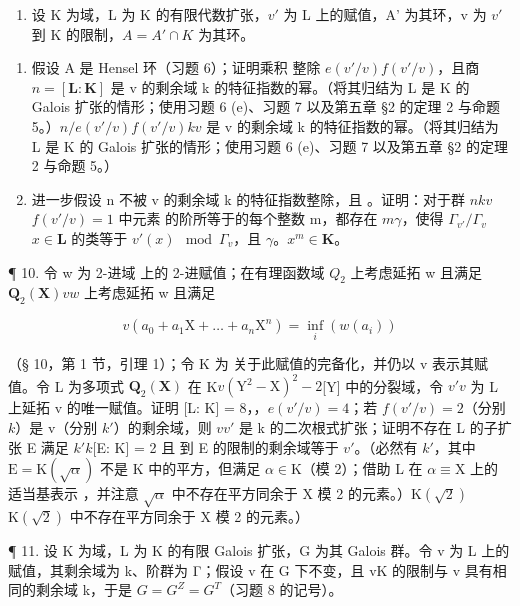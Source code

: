 \begin{enumerate}
\def\labelenumi{\arabic{enumi}.}
\setcounter{enumi}{8}
\tightlist
\item
  设 K 为域，L 为 K 的有限代数扩张，\(v'\) 为 L 上的赋值，A' 为其环，v 为 \(v'\) 到 K 的限制，\(A = A' \cap K\) 为其环。
\end{enumerate}

\begin{enumerate}
\def\labelenumi{(\alph{enumi})}
\item
  假设 A 是 Hensel 环（习题 6）；证明乘积  整除 \(e(v'/v)f(v'/v)\)，且商 \(n = [\mathbf{L}:\mathbf{K}]\) 是 v 的剩余域 k 的特征指数的幂。（将其归结为 L 是 K 的 Galois 扩张的情形；使用习题 6 (e)、习题 7 以及第五章 §2 的定理 2 与命题 5。）\(n / e(v'/v)f(v'/v)\)\(k\)\(v\) 是 v 的剩余域 k 的特征指数的幂。（将其归结为 L 是 K 的 Galois 扩张的情形；使用习题 6 (e)、习题 7 以及第五章 §2 的定理 2 与命题 5。）
\item
  进一步假设 n 不被 v 的剩余域 k 的特征指数整除，且 。证明：对于群 \(n\)\(k\)\(v\)\(f(v' / v) = 1\) 中元素  的阶所等于的每个整数 m，都存在 \(m\)\(\gamma\)，使得 \(\Gamma_{v'} / \Gamma_v\)\(x \in \mathbf{L}\) 的类等于 \(v'(x) \mod \Gamma_v\)，且 \(\gamma\)。\(x^m \in \mathbf{K}\)。
\end{enumerate}

¶ 10. 令 w 为 2-进域  上的 2-进赋值；在有理函数域 \(Q_{2}\) 上考虑延拓 w 且满足\(\mathbf{Q}_2(\mathbf{X})\)\(v\)\(w\) 上考虑延拓 w 且满足

\[
v (a _ {0} + a _ {1} \mathrm{X} + \dots + a _ {n} \mathrm{X} ^ {n}) = \inf _ {i} (w (a _ {i}))
\]

（§ 10，第 1 节，引理 1）；令 K 为  关于此赋值的完备化，并仍以 v 表示其赋值。令 L 为多项式 \(\mathbf{Q}_2(\mathbf{X})\) 在 K\(v\)\((\mathrm{Y}^2 - \mathrm{X})^2 - 2\){[}Y{]} 中的分裂域，令 \(v'\)\(v\) 为 L 上延拓 v 的唯一赋值。证明 {[}L: K{]} = 8，，\(e(v'/v) = 4\)；若 \(f(v'/v) = 2\)（分别 \(k\)）是 v（分别 \(k'\)）的剩余域，则 \(v\)\(v'\) 是 k 的二次根式扩张；证明不存在 L 的子扩张 E 满足 \(k'\)\(k\){[}E: K{]} = 2 且  到 E 的限制的剩余域等于 \(v'\)。（必然有 \(k'\)，其中 \(\mathrm{E} = \mathrm{K}(\sqrt{\alpha})\) 不是 K 中的平方，但满足 \(\alpha \in \mathrm{K}\)（模 2）；借助 L 在 \(\alpha \equiv \mathrm{X}\) 上的适当基表示 ，并注意 \(\sqrt{\alpha}\) 中不存在平方同余于 X 模 2 的元素。）\(\mathrm{K}(\sqrt{2})\)\(\mathrm{K}(\sqrt{2})\) 中不存在平方同余于 X 模 2 的元素。）

¶ 11. 设 K 为域，L 为 K 的有限 Galois 扩张，G 为其 Galois 群。令 v 为 L 上的赋值，其剩余域为 k、阶群为 Γ；假设 v 在 G 下不变，且 v\textbar K 的限制与 v 具有相同的剩余域 k，于是 \(G = G^{Z} = G^{T}\)（习题 8 的记号）。

